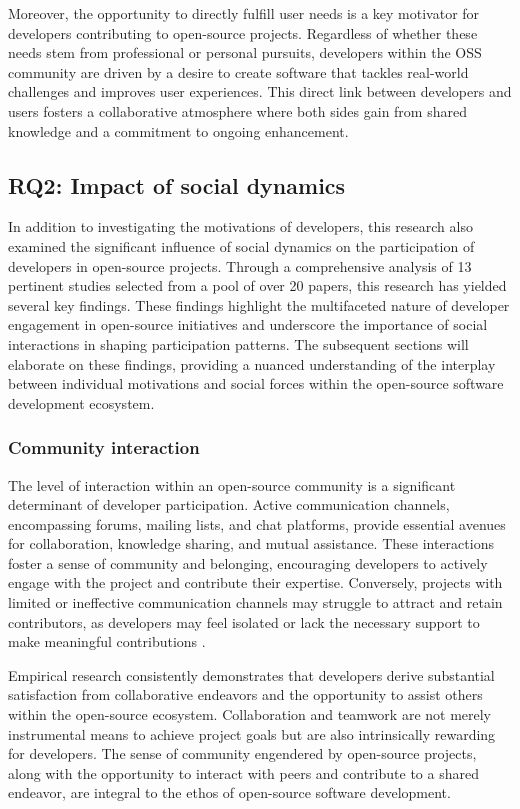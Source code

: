 Moreover, the opportunity to directly fulfill user needs is a key motivator for developers contributing to open-source projects. Regardless of whether these needs stem from professional or personal pursuits, developers within the OSS community are driven by a desire to create software that tackles real-world challenges and improves user experiences. This direct link between developers and users fosters a collaborative atmosphere where both sides gain from shared knowledge and a commitment to ongoing enhancement.

\subsection{RQ2: Impact of social dynamics}

In addition to investigating the motivations of developers, this research also examined the significant influence of social dynamics on the participation of developers in open-source projects. Through a comprehensive analysis of 13 pertinent studies selected from a pool of over 20 papers, this research has yielded several key findings. These findings highlight the multifaceted nature of developer engagement in open-source initiatives and underscore the importance of social interactions in shaping participation patterns. The subsequent sections will elaborate on these findings, providing a nuanced understanding of the interplay between individual motivations and social forces within the open-source software development ecosystem.

\subsubsection{Community interaction}
The level of interaction within an open-source community is a significant determinant of developer participation. Active communication channels, encompassing forums, mailing lists, and chat platforms, provide essential avenues for collaboration, knowledge sharing, and mutual assistance. These interactions foster a sense of community and belonging, encouraging developers to actively engage with the project and contribute their expertise. Conversely, projects with limited or ineffective communication channels may struggle to attract and retain contributors, as developers may feel isolated or lack the necessary support to make meaningful contributions \citep{05bitzer2007intrinsic,11gerosa2021shifting,20freeman2007material}.


Empirical research consistently demonstrates that developers derive substantial satisfaction from collaborative endeavors and the opportunity to assist others within the open-source ecosystem. Collaboration and teamwork are not merely instrumental means to achieve project goals but are also intrinsically rewarding for developers. The sense of community engendered by open-source projects, along with the opportunity to interact with peers and contribute to a shared endeavor, are integral to the ethos of open-source software development.


